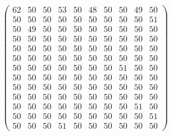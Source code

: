 \documentclass[12pt,oneside,a4paper]{article}
\begin{document}
  \begin{equation}
    \begin{pmatrix} 62 & 50 & 50 & 53 & 50 & 48 & 50 & 50 & 49 & 50 \\
                    50 & 50 & 50 & 50 & 50 & 50 & 50 & 50 & 50 & 51 \\
                    50 & 49 & 50 & 50 & 50 & 50 & 50 & 50 & 50 & 50 \\
                    50 & 50 & 50 & 50 & 50 & 50 & 50 & 50 & 50 & 50 \\
                    50 & 50 & 50 & 50 & 50 & 50 & 50 & 50 & 50 & 50 \\
                    50 & 50 & 50 & 50 & 50 & 50 & 50 & 50 & 50 & 50 \\
                    50 & 50 & 50 & 50 & 50 & 50 & 50 & 51 & 50 & 50 \\
                    50 & 50 & 50 & 50 & 50 & 50 & 50 & 50 & 50 & 50 \\
                    50 & 50 & 50 & 50 & 50 & 50 & 50 & 50 & 50 & 50 \\
                    50 & 50 & 50 & 50 & 50 & 50 & 50 & 50 & 50 & 50 \\
                    50 & 50 & 50 & 50 & 50 & 50 & 50 & 50 & 51 & 50 \\
                    50 & 50 & 50 & 50 & 50 & 50 & 50 & 50 & 50 & 51 \\
                    50 & 50 & 50 & 51 & 50 & 50 & 50 & 50 & 50 & 50
    \end{pmatrix}
  \end{equation}

  \newpage
  \begin{table}[h]
    \caption{Average of the paramaters for the four configurations}
  \end{table}
\end{document}
